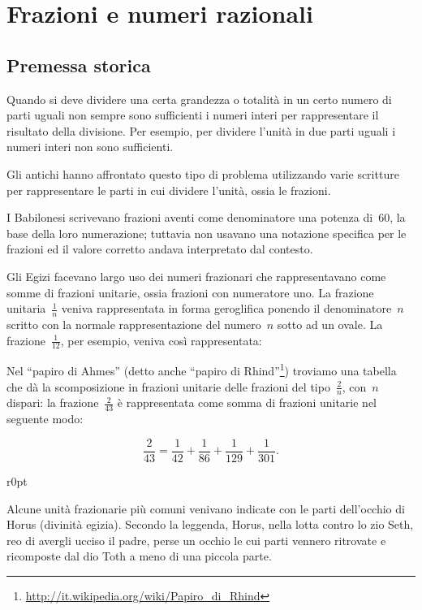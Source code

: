 \chapter{Frazioni e numeri razionali}
\section{Premessa storica}

Quando si deve dividere una certa grandezza o totalità in un certo numero di parti uguali non sempre
sono sufficienti i numeri interi per rappresentare il risultato della divisione. Per esempio, per dividere
l'unità in due parti uguali i numeri interi non sono sufficienti.

Gli antichi hanno affrontato questo tipo di problema utilizzando varie scritture per rappresentare
le parti in cui dividere l'unità, ossia le frazioni.

I Babilonesi scrivevano frazioni aventi come denominatore una potenza di~60, la base della
loro numerazione; tuttavia non usavano una notazione specifica per le frazioni ed
il valore corretto andava interpretato dal contesto.

Gli Egizi facevano largo uso dei numeri frazionari che rappresentavano come somme di frazioni unitarie,
ossia frazioni con numeratore uno. La frazione unitaria~$\frac{1}{n}$ 
veniva rappresentata in forma geroglifica ponendo il denominatore~$n$ scritto con la normale rappresentazione del numero~$n$ sotto ad un ovale. La frazione~$\frac{1}{12}$, per esempio, veniva così rappresentata:

\begin{center}
 
\end{center}

Nel ``papiro di Ahmes'' (detto anche ``papiro di Rhind''\footnote{\url{http://it.wikipedia.org/wiki/Papiro_di_Rhind}}) troviamo una tabella che dà la scomposizione in frazioni
unitarie delle frazioni del tipo~$\frac{2}{n}$, con~$n$ dispari: la frazione~$\frac{2}{43}$
è rappresentata come somma di frazioni
unitarie nel seguente modo:

\[\frac{2}{43}=\frac{1}{42}+\frac{1}{86}+\frac{1}{129}+\frac{1}{301}.\]
\begin{wrapfigure}{r}{0pt}

\end{wrapfigure}

Alcune unità frazionarie più comuni venivano indicate con le parti dell'occhio di Horus (divinità egizia). Secondo la
leggenda, Horus, nella lotta contro lo zio Seth, reo di avergli ucciso il padre,
perse un occhio le cui parti vennero ritrovate e ricomposte dal dio Toth a meno di una piccola parte.

